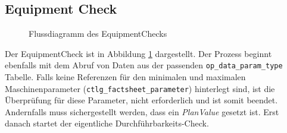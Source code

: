 \subsection{Equipment Check}

\begin{figure}[!htbp]
    \centering
    \caption{Flussdiagramm des \gls{EquipmentCheck}s}
    \label{fig:equipment-check}
\end{figure}

Der \gls{EquipmentCheck} ist in Abbildung \ref{fig:equipment-check} dargestellt. Der Prozess beginnt ebenfalls mit dem Abruf von Daten aus der passenden \texttt{op\_data\_param\_type} Tabelle. Falls keine Referenzen für den minimalen und maximalen Maschinenparameter (\texttt{ctlg\_factsheet\_parameter}) hinterlegt sind, ist die Überprüfung für diese Parameter, nicht erforderlich und ist somit beendet. Andernfalls muss sichergestellt werden, dass ein \textit{PlanValue} gesetzt ist. Erst danach startet der eigentliche Durchführbarkeits-Check.

